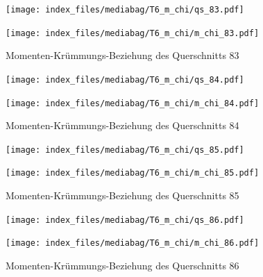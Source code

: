 \documentclass[
  11pt,
  letterpaper,
]{scrreprt}
\begin{document}
\begin{figure}[H]

\begin{minipage}{0.50\linewidth}
\texttt{[image: index\_files/mediabag/T6\_m\_chi/qs\_83.pdf]}\end{minipage}%
%
\begin{minipage}{0.50\linewidth}
\texttt{[image: index\_files/mediabag/T6\_m\_chi/m\_chi\_83.pdf]}\end{minipage}%

\caption{\label{fig-mchi_anhang}Momenten-Krümmungs-Beziehung des
Querschnitts 83}

\end{figure}%

\begin{figure}[H]

\begin{minipage}{0.50\linewidth}
\texttt{[image: index\_files/mediabag/T6\_m\_chi/qs\_84.pdf]}\end{minipage}%
%
\begin{minipage}{0.50\linewidth}
\texttt{[image: index\_files/mediabag/T6\_m\_chi/m\_chi\_84.pdf]}\end{minipage}%

\caption{\label{fig-mchi_anhang}Momenten-Krümmungs-Beziehung des
Querschnitts 84}

\end{figure}%

\begin{figure}[H]

\begin{minipage}{0.50\linewidth}
\texttt{[image: index\_files/mediabag/T6\_m\_chi/qs\_85.pdf]}\end{minipage}%
%
\begin{minipage}{0.50\linewidth}
\texttt{[image: index\_files/mediabag/T6\_m\_chi/m\_chi\_85.pdf]}\end{minipage}%

\caption{\label{fig-mchi_anhang}Momenten-Krümmungs-Beziehung des
Querschnitts 85}

\end{figure}%

\begin{figure}[H]

\begin{minipage}{0.50\linewidth}
\texttt{[image: index\_files/mediabag/T6\_m\_chi/qs\_86.pdf]}\end{minipage}%
%
\begin{minipage}{0.50\linewidth}
\texttt{[image: index\_files/mediabag/T6\_m\_chi/m\_chi\_86.pdf]}\end{minipage}%

\caption{\label{fig-mchi_anhang}Momenten-Krümmungs-Beziehung des
Querschnitts 86}

\end{figure}%
\end{document}
